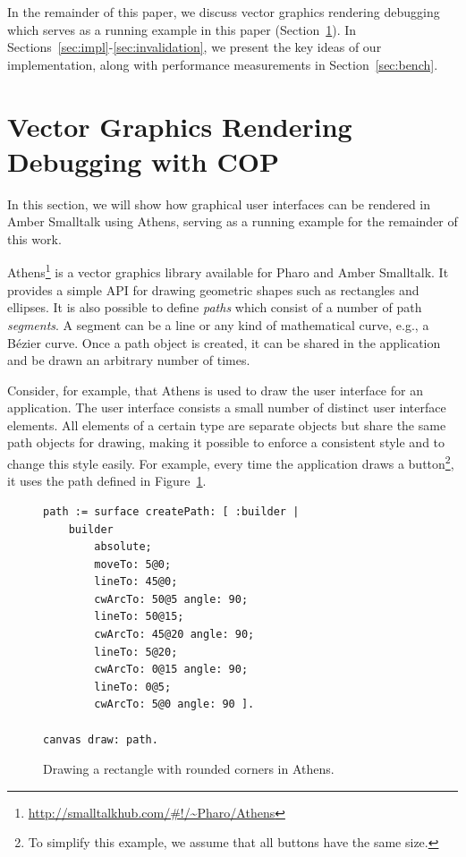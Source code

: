 \documentclass{sig-alternate}
\begin{document}
In the remainder of this paper, we discuss vector graphics rendering debugging which serves as a running example in this paper (Section~\ref{sec:vector}). In Sections~\ref{sec:impl}-\ref{sec:invalidation}, we present the key ideas of our implementation, along with performance measurements in Section~\ref{sec:bench}.

\section{Vector Graphics Rendering Debugging with COP}
\label{sec:vector}
In this section, we will show how graphical user interfaces can be rendered in Amber Smalltalk using Athens, serving as a running example for the remainder of this work.

Athens\footnote{\url{http://smalltalkhub.com/\#!/~Pharo/Athens}} is a vector graphics library available for Pharo and Amber Smalltalk. It provides a simple API for drawing geometric shapes such as rectangles and ellipses. It is also possible to define \emph{paths} which consist of a number of path \emph{segments}. A segment can be a line or any kind of mathematical curve, e.g., a Bézier curve. Once a path object is created, it can be shared in the application and be drawn an arbitrary number of times.

Consider, for example, that Athens is used to draw the user interface for an application. The user interface consists a small number of distinct user interface elements. All elements of a certain type are separate objects but share the same path objects for drawing, making it possible to enforce a consistent style and to change this style easily. For example, every time the application draws a button\footnote{To simplify this example, we assume that all buttons have the same size.}, it uses the path defined in Figure~\ref{fig:source_athens}.

\begin{figure}[!htp]
\begin{lstlisting}
path := surface createPath: [ :builder |
    builder 
        absolute;
        moveTo: 5@0;
        lineTo: 45@0;          
        cwArcTo: 50@5 angle: 90; 
        lineTo: 50@15;
        cwArcTo: 45@20 angle: 90;
        lineTo: 5@20;
        cwArcTo: 0@15 angle: 90;
        lineTo: 0@5;
        cwArcTo: 5@0 angle: 90 ].

canvas draw: path.
\end{lstlisting}
\caption{Drawing a rectangle with rounded corners in Athens.}
\label{fig:source_athens}
\end{figure}
\end{document}
